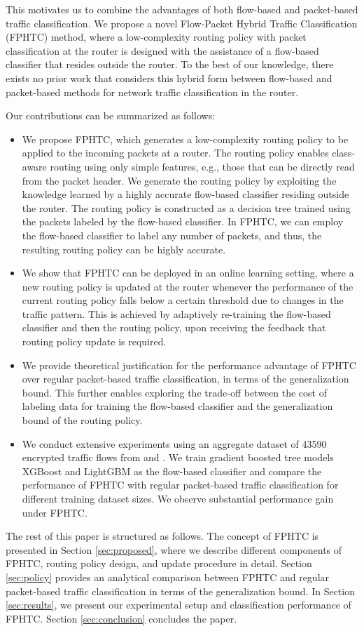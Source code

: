This motivates us to combine the advantages of both flow-based and packet-based traffic classification. We propose a novel Flow-Packet Hybrid Traffic Classification (FPHTC) method, where a low-complexity routing policy with packet classification at the router is designed with the assistance of a flow-based classifier that resides outside the router. To the best of our knowledge, there exists no prior work that considers this hybrid form between flow-based and packet-based methods for network traffic classification in the router.

Our contributions can be summarized as follows:
\begin{itemize}
	\item We propose FPHTC, which generates a low-complexity routing policy to be applied to the incoming packets at a router. The routing policy enables class-aware routing using only simple features, e.g., those that can be directly read from the packet header. We generate the routing policy by exploiting the knowledge learned by a highly accurate flow-based classifier residing outside the router. The routing policy is constructed as a decision tree trained using the packets labeled by the flow-based classifier. In FPHTC, we can employ the flow-based classifier to label any number of packets, and thus, the resulting routing policy can be highly accurate.
	\item We show that FPHTC can be deployed in an online learning setting, where a new routing policy is updated at the router whenever the performance of the current routing policy falls below a certain threshold due to changes in the traffic pattern. This is achieved by adaptively re-training the flow-based classifier and then the routing policy, upon receiving the feedback that routing policy update is required.
	\item We provide theoretical justification for the performance advantage of FPHTC over regular packet-based traffic classification, in terms of the generalization bound. This further enables exploring the trade-off between the cost of labeling data for training the flow-based classifier and the generalization bound of the routing policy.
	\item We conduct extensive experiments using an aggregate dataset of 43590 encrypted traffic flows from \cite{Vpn16} and \cite{Tor17}. We train gradient boosted tree models XGBoost \cite{Xgb16} and LightGBM \cite{Lgbm17} as the flow-based classifier and compare the performance of FPHTC with regular packet-based traffic classification for different training dataset sizes. We observe substantial  performance gain under FPHTC.
\end{itemize}

The rest of this paper is structured as follows. The concept of FPHTC is presented in Section \ref{sec:proposed}, where we describe different components of FPHTC, routing policy design, and update procedure in detail. Section \ref{sec:policy} provides an analytical comparison between FPHTC and regular packet-based traffic classification in terms of the generalization bound. In Section \ref{sec:results}, we present our experimental setup and classification performance of FPHTC. Section \ref{sec:conclusion} concludes the paper.